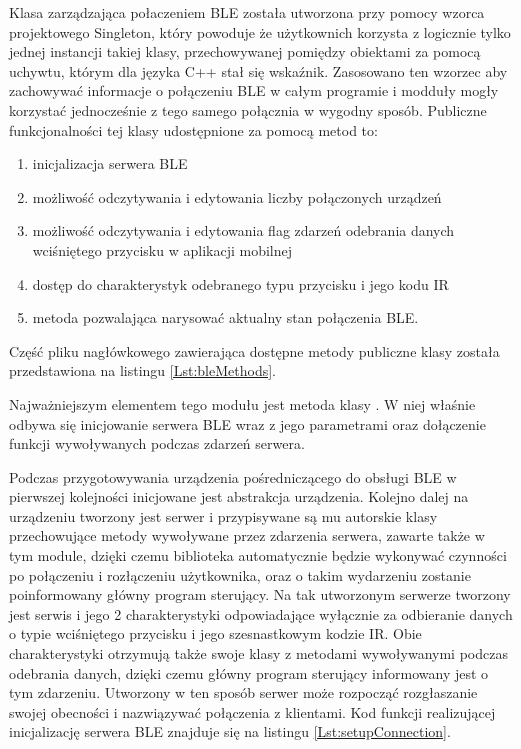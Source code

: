 \documentclass[12pt,twoside]{article}
\begin{document}
Klasa zarządzająca połaczeniem BLE została utworzona przy pomocy wzorca projektowego Singleton\cite{designPatterns}, który powoduje że użytkownich korzysta z logicznie tylko jednej instancji takiej klasy, przechowywanej pomiędzy obiektami za pomocą uchywtu, którym dla języka C++ stał się wskaźnik. Zasosowano ten wzorzec aby zachowywać informacje o połączeniu BLE w całym programie i modduły mogły korzystać jednocześnie z tego samego połącznia w wygodny sposób. Publiczne funkcjonalności tej klasy udostępnione za pomocą metod to:
\begin{enumerate}[label=\alph*), leftmargin=1.25cm]
   \item inicjalizacja serwera BLE
   \item możliwość odczytywania i edytowania liczby połączonych urządzeń
   \item możliwość odczytywania i edytowania flag zdarzeń odebrania danych wciśniętego przycisku w aplikacji mobilnej
   \item dostęp do charakterystyk odebranego typu przycisku i jego kodu IR
   \item metoda pozwalająca narysować aktualny stan połączenia BLE.
\end{enumerate} Część pliku nagłówkowego zawierająca dostępne metody publiczne klasy  została przedstawiona na listingu \ref*{Lst:bleMethods}.



Najważniejszym elementem tego modułu jest metoda  klasy . W niej właśnie odbywa się inicjowanie serwera BLE wraz z jego parametrami oraz dołączenie funkcji wywoływanych podczas zdarzeń serwera.

Podczas przygotowywania urządzenia pośredniczącego do obsługi BLE w pierwszej kolejności inicjowane jest abstrakcja urządzenia. Kolejno dalej na urządzeniu tworzony jest serwer i przypisywane są mu autorskie klasy przechowujące metody wywoływane przez zdarzenia serwera, zawarte także w tym module, dzięki czemu biblioteka automatycznie będzie wykonywać czynności po połączeniu i rozłączeniu użytkownika, oraz o takim wydarzeniu zostanie poinformowany główny program sterujący.
Na tak utworzonym serwerze tworzony jest serwis i jego 2 charakterystyki odpowiadające wyłącznie za odbieranie danych o typie wciśniętego przycisku i jego szesnastkowym kodzie IR. Obie charakterystyki otrzymują także swoje klasy z metodami wywoływanymi podczas odebrania danych, dzięki czemu główny program sterujący informowany jest o tym zdarzeniu. Utworzony w ten sposób serwer może rozpocząć rozgłaszanie swojej obecności i nazwiązywać połączenia z klientami. Kod funkcji realizującej inicjalizację serwera BLE znajduje się na listingu \ref*{Lst:setupConnection}.
\end{document}
